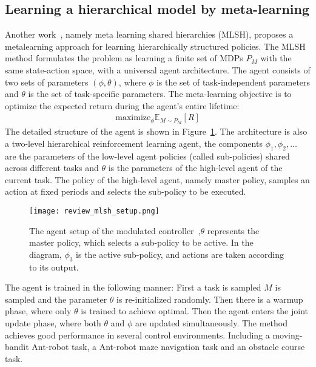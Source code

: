 \subsection{Learning a hierarchical model by meta-learning}
Another work~\cite{frans2017meta}, namely meta learning shared hierarchies (MLSH), proposes a metalearning approach for learning hierarchically structured policies.
The MLSH method formulates the problem as learning a finite set of MDPs $P_M$ with the same state-action space, with a universal agent architecture. The agent consists of two sets of parameters $(\phi,\theta)$, where $\phi$ is the set of task-independent parameters and $\theta$ is the set of task-specific parameters. The meta-learning objective is to optimize the expected return during the agent's entire lifetime:
\begin{align}
\mathrm{maximize}_\phi \mathbb{E}_{M\sim P_M}[R]
\end{align}
The detailed structure of the agent is shown in Figure~\ref{review_mlsh_arch}. The architecture is also a two-level hierarchical reinforcement learning agent, the components $\phi_1,\phi_2,\dots$ are the parameters of the low-level agent policies (called sub-policies) shared across different tasks and $\theta$ is the parameters of the high-level agent of the current task. The policy of the high-level agent, namely master policy, samples an action at fixed periods and selects the sub-policy to be executed.
\begin{figure}[h]
	\texttt{[image: review\_mlsh\_setup.png]}
	\centering
	\caption{The agent setup of the modulated controller~\cite{frans2017meta},$\theta$ represents the master policy, which selects
		a sub-policy to be active. In the diagram, $\phi_3$ is the active sub-policy, and actions are taken according
		to its output.}\label{review_mlsh_arch}
\end{figure}
The agent is trained in the following manner: First a task is sampled $M$ is sampled and the parameter $\theta$ is re-initialized randomly. Then there is a warmup phase, where only $\theta$ is trained to achieve optimal. Then the agent enters the joint update phase, where both $\theta$ and $\phi$ are updated simultaneously.
The method achieves good performance in several control environments. Including a moving-bandit Ant-robot task, a Ant-robot maze navigation task and an obstacle course task. 

